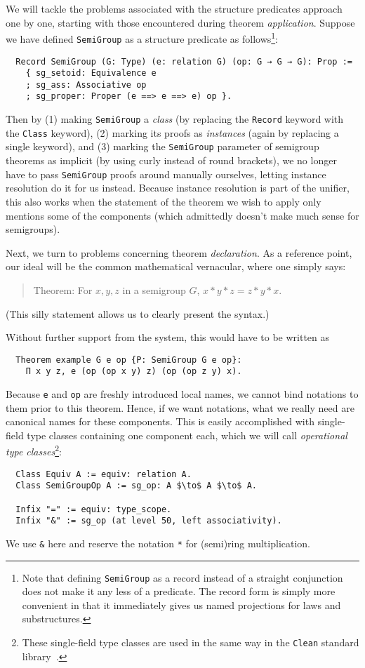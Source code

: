 \documentclass[a4paper,10pt,runningheads]{llncs}
\begin{document}
We will tackle the problems associated with the structure predicates approach one by one, starting with those encountered during theorem \emph{application}. Suppose we have defined \lstinline|SemiGroup| as a structure predicate as follows\footnote{Note that defining \lstinline|SemiGroup| as a record instead of a straight conjunction does not make it any less of a predicate. The record form is simply more convenient in that it immediately gives us named projections for laws and substructures.}:
\begin{lstlisting}
  Record SemiGroup (G: Type) (e: relation G) (op: G → G → G): Prop :=
    { sg_setoid: Equivalence e
    ; sg_ass: Associative op
    ; sg_proper: Proper (e ==> e ==> e) op }.
\end{lstlisting}
Then by (1) making \lstinline|SemiGroup| a \emph{class} (by replacing the \lstinline|Record| keyword with the \lstinline|Class| keyword), (2) marking its proofs as \emph{instances} (again by replacing a single keyword), and (3) marking the \lstinline|SemiGroup| parameter of semigroup theorems as implicit (by using curly instead of round brackets), we no longer have to pass \lstinline|SemiGroup| proofs around manually ourselves, letting instance resolution do it for us instead. Because instance resolution is part of the unifier, this also works when the statement of the theorem we wish to apply only mentions some of the components (which admittedly doesn't make much sense for semigroups).

Next, we turn to problems concerning theorem \emph{declaration}. As a reference point, our ideal will be the common mathematical vernacular, where one simply says:
\begin{quote}
Theorem: For $x, y, z$ in a semigroup $G$, $x * y * z = z * y * x$.
\end{quote}
(This silly statement allows us to clearly present the syntax.)

Without further support from the system, this would have to be written as
\begin{lstlisting}
  Theorem example G e op {P: SemiGroup G e op}:
    Π x y z, e (op (op x y) z) (op (op z y) x).
\end{lstlisting}
Because \lstinline|e| and \lstinline{op} are freshly introduced local names, we cannot bind notations to them prior to this theorem. Hence, if we want notations, what we really need are canonical names for these components. This is easily accomplished with single-field type classes containing one component each, which we will call \emph{operational type classes}\footnote{These single-field type classes are used in the same way in the \lstinline|Clean| standard library~\cite{clean}.}:
\begin{lstlisting}
  Class Equiv A := equiv: relation A.
  Class SemiGroupOp A := sg_op: A $\to$ A $\to$ A.

  Infix "=" := equiv: type_scope.
  Infix "&" := sg_op (at level 50, left associativity).
\end{lstlisting}
We use \lstinline|&| here and reserve the notation \lstinline|*| for (semi)ring multiplication.
\end{document}
